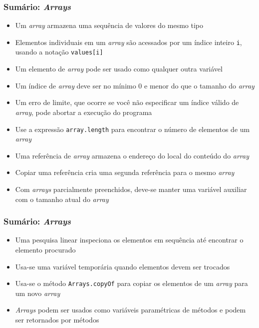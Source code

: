 \documentclass[xcolor={dvipsnames,table},aspectratio=169]{beamer}
\begin{document}
\begin{frame}\frametitle{Sumário: \emph{Arrays}}
\begin{itemize}
	\item Um \emph{array} armazena uma sequência de valores do mesmo tipo
	\item Elementos individuais em um \emph{array} são acessados por um índice inteiro \texttt{i}, usando a notação \texttt{values[i]}
	\item Um elemento de \emph{array} pode ser usado como qualquer outra variável
	\item Um índice de \emph{array} deve ser no mínimo 0 e menor do que o tamanho do \emph{array}
	\item Um erro de limite, que ocorre se você não especificar um índice válido de \emph{array}, pode abortar a execução do programa
	\item Use a expressão \texttt{array.length} para encontrar o número de elementos de um \emph{array}
	\item Uma referência de \emph{array} armazena o endereço do local do conteúdo do \emph{array}
	\item Copiar uma referência cria uma segunda referência para o mesmo \emph{array}
	\item Com \emph{arrays} parcialmente preenchidos, deve-se manter uma variável auxiliar com o tamanho atual do \emph{array}
\end{itemize}
\end{frame}

\begin{frame}\frametitle{Sumário: \emph{Arrays}}
\begin{itemize}
	\item Uma pesquisa linear inspeciona os elementos em sequência até encontrar o elemento procurado
	\item Usa-se uma variável temporária quando elementos devem ser trocados
	\item Usa-se o método \texttt{Arrays.copyOf} para copiar os elementos de um \emph{array} para um novo \emph{array}
	\item \emph{Arrays} podem ser usados como variáveis paramétricas de métodos e podem ser retornados por métodos
\end{itemize}
\end{frame}
\end{document}
